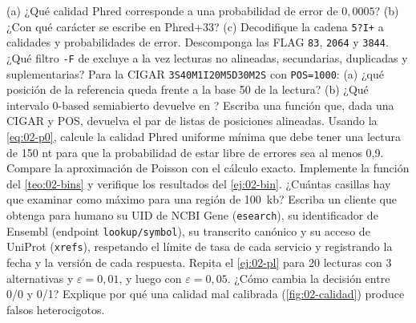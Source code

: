\begin{ejercicios}
 (a) ¿Qué calidad Phred corresponde a una probabilidad de error de $0{,}0005$? (b) ¿Con qué carácter se escribe en Phred+33? (c) Decodifique la cadena \texttt{5?I+} a calidades y probabilidades de error.
 Descomponga las FLAG \texttt{83}, \texttt{2064} y \texttt{3844}. ¿Qué filtro \texttt{-F} de  excluye a la vez lecturas no alineadas, secundarias, duplicadas y suplementarias?
 Para la CIGAR \texttt{3S40M1I20M5D30M2S} con \texttt{POS=1000}: (a) ¿qué posición de la referencia queda frente a la base 50 de la lectura? (b) ¿Qué intervalo 0-based semiabierto devuelve  en ? Escriba una función que, dada una CIGAR y POS, devuelva el par de listas de posiciones alineadas.
 Usando la \cref{eq:02-p0}, calcule la calidad Phred uniforme mínima que debe tener una lectura de 150 nt para que la probabilidad de estar libre de errores sea al menos 0,9. Compare la aproximación de Poisson con el cálculo exacto.
 Implemente la función  del \cref{teo:02-bins} y verifique los resultados del \cref{ej:02-bin}. ¿Cuántas casillas hay que examinar como máximo para una región de \SI{100}{kb}?
 Escriba un cliente que obtenga para  humano su UID de NCBI Gene (\texttt{esearch}), su identificador de Ensembl (endpoint \texttt{lookup/symbol}), su transcrito canónico y su acceso de UniProt (\texttt{xrefs}), respetando el límite de tasa de cada servicio y registrando la fecha y la versión de cada respuesta.
 Repita el \cref{ej:02-pl} para 20 lecturas con 3 alternativas y $\varepsilon=0{,}01$, y luego con $\varepsilon=0{,}05$. ¿Cómo cambia la decisión entre 0/0 y 0/1? Explique por qué una calidad mal calibrada (\cref{fig:02-calidad}) produce falsos heterocigotos.
\end{ejercicios}

